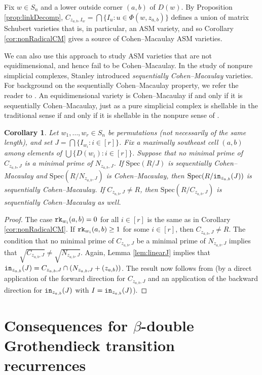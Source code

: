 \documentclass[12pt,reqno]{amsart}
\newtheorem{corollary}[theorem]{Corollary}
\newtheorem{Main Conjecture}[theorem]{Main Conjecture}
\theoremstyle{remark}
\theoremstyle{plain}
\newcommand{\init}{{\tt in}}
\newcommand{\rk}{{\tt rk}}
\newcommand{\spec}{{\mbox{Spec}}}
\begin{document}
Fix $w \in S_n$ and a lower outside corner $(a,b)$ of $D(w)$. By Proposition \ref{prop:linkDecomp}, 
$C_{z_{a,b},I_w} =  \bigcap\{ I_{u}:u \in \Phi(w,z_{a,b})\}$
defines a union of matrix Schubert varieties that is, in particular, an ASM variety, and so Corollary \ref{cor:nonRadicalCM} gives a source of Cohen--Macaulay ASM varieties.  

We can also use this approach to study ASM varieties that are not equidimensional, and hence fail to be Cohen--Macaulay.  In the study of nonpure simplicial complexes, Stanley introduced \emph{sequentially Cohen--Macaulay} varieties.  For background on the sequentially Cohen--Macaulay property, we refer the reader to \cite[Section III.2]{Sta96}. An equidimensional variety is Cohen--Macaulay if and only if it is sequentially Cohen--Macaulay, just as a pure simplicial complex is shellable in the traditional sense if and only if it is shellable in the nonpure sense of \cite{BW96}.

\begin{corollary}\label{cor:seqCM}
Let $w_1, \ldots, w_r \in S_n$ be permutations (not necessarily of the same  length), and set 
$J= \bigcap \{I_{w_i}:i\in[r]\}$.
Fix a maximally southeast cell $(a,b)$ among elements of $\bigcup \{D(w_i):i\in[r]\}$.
Suppose that no minimal prime of $C_{z_{a,b},J}$ is a minimal prime of $N_{z_{a,b},J}$.  If $\spec(R/J)$ is sequentially Cohen--Macaulay and $\spec(R/N_{z_{a,b},J})$ is Cohen--Macaulay, then $\spec(R/\init_{z_{a,b}}(J))$ is sequentially Cohen--Macaulay.  If $C_{z_{a,b},J} \neq R$, then $\spec(R/C_{z_{a,b},J})$ is sequentially Cohen--Macaulay as well.  
\end{corollary}

\begin{proof}
The case $\rk_{w_i}(a,b) = 0$ for all $i \in [r]$ is the same as in Corollary \ref{cor:nonRadicalCM}. If $\rk_{w_i}(a,b) \geq 1$ for some $i \in [r]$, then $C_{z_{a,b},J} \neq R$.  The condition that no minimal prime of $C_{z_{a,b},J}$ be a minimal prime of $N_{z_{a,b},J}$ implies that $\sqrt{C_{z_{a,b},J}} \neq \sqrt{N_{z_{a,b},J}}$.  Again, Lemma \ref{lem:linearJ} implies that $\init_{z_{a,b}}(J) = C_{z_{a,b},J} \cap (N_{z_{a,b},J}+(z_{a,b}))$.  The result now follows from \cite[Theorem 7.1]{KR} (by a direct application of the forward direction for $C_{z_{a,b},J}$ and an application of the backward direction for $\init_{z_{a,b}}(J)$ with $I = \init_{z_{a,b}}(J)$).
\end{proof}


\section{Consequences for $\beta$-double Grothendieck transition recurrences}
\label{section:additionalConsequences}
\end{document}

